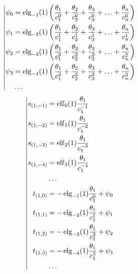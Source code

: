 \begin{equation*} \left| \begin{aligned}
\psi_0 &= \elg_{-1}(1) \left(
  \frac{\theta_1}{c_1^0}
+ \frac{\theta_2}{c_2^0}
+ \frac{\theta_3}{c_3^0}
+ \ldots
+ \frac{\theta_n}{c_n^0} \right) \\
%
\psi_1 &= \elg_{-2}(1) \left(
  \frac{\theta_1}{c_1^1}
+ \frac{\theta_2}{c_2^1}
+ \frac{\theta_3}{c_3^1}
+ \ldots
+ \frac{\theta_n}{c_n^1} \right) \\
%
\psi_2 &= \elg_{-3}(1) \left(
  \frac{\theta_1}{c_1^2}
+ \frac{\theta_2}{c_2^2}
+ \frac{\theta_3}{c_3^2}
+ \ldots
+ \frac{\theta_n}{c_n^2} \right) \\
%
\psi_3 &= \elg_{-4}(1) \left(
  \frac{\theta_1}{c_1^3}
+ \frac{\theta_2}{c_2^3}
+ \frac{\theta_3}{c_3^3}
+ \ldots
+ \frac{\theta_n}{c_n^3} \right) \\
%
&\ldots \\
\end{aligned} \right. \end{equation*}
%
\begin{equation*} \left| \begin{aligned}
%
s_{(1,-1)} &=
  \elf_0(1) \frac{\theta_1}{c_1^{-1}} \\
%
s_{(1,-2)} &=
  \elf_1(1) \frac{\theta_1}{c_1^{-2}} \\
%
s_{(1,-3)} &=
  \elf_2(1) \frac{\theta_1}{c_1^{-3}} \\
%
s_{(1,-4)} &=
  \elf_3(1) \frac{\theta_1}{c_1^{-4}} \\
%
&\ldots \\
%
t_{(1,0)} &=
- \elg_{-1}(1) \frac{\theta_1}{c_1^0}
+ \psi_0 \\
%
t_{(1,1)} &=
- \elg_{-2}(1) \frac{\theta_1}{c_1^1}
+ \psi_1 \\
%
t_{(1,2)} &=
- \elg_{-3}(1) \frac{\theta_1}{c_1^2}
+ \psi_2 \\
%
t_{(1,3)} &=
- \elg_{-4}(1) \frac{\theta_1}{c_1^3}
+ \psi_3 \\
%
&\ldots \\
\end{aligned} \right. \end{equation*}

